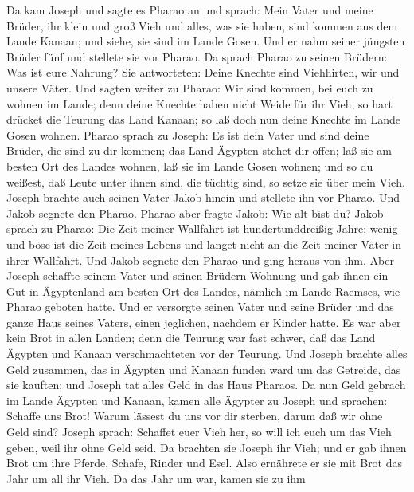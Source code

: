  Da kam Joseph und sagte es Pharao an und sprach: Mein Vater
und meine Brüder, ihr klein und groß Vieh und alles, was sie haben, sind
kommen aus dem Lande Kanaan; und siehe, sie sind im Lande Gosen.
 Und er nahm seiner jüngsten Brüder fünf und stellete sie
vor Pharao.  Da sprach Pharao zu seinen Brüdern: Was ist
eure Nahrung? Sie antworteten: Deine Knechte sind Viehhirten, wir und
unsere Väter.  Und sagten weiter zu Pharao: Wir sind kommen,
bei euch zu wohnen im Lande; denn deine Knechte haben nicht Weide für
ihr Vieh, so hart drücket die Teurung das Land Kanaan; so laß doch nun
deine Knechte im Lande Gosen wohnen.  Pharao sprach zu
Joseph: Es ist dein Vater und sind deine Brüder, die sind zu dir kommen;
 das Land Ägypten stehet dir offen; laß sie am besten Ort
des Landes wohnen, laß sie im Lande Gosen wohnen; und so du weißest, daß
Leute unter ihnen sind, die tüchtig sind, so setze sie über mein Vieh.
 Joseph brachte auch seinen Vater Jakob hinein und stellete
ihn vor Pharao. Und Jakob segnete den Pharao.  Pharao aber
fragte Jakob: Wie alt bist du?  Jakob sprach zu Pharao: Die
Zeit meiner Wallfahrt ist hundertunddreißig Jahre; wenig und böse ist
die Zeit meines Lebens und langet nicht an die Zeit meiner Väter in
ihrer Wallfahrt.  Und Jakob segnete den Pharao und ging
heraus von ihm.  Aber Joseph schaffte seinem Vater und
seinen Brüdern Wohnung und gab ihnen ein Gut in Ägyptenland am besten
Ort des Landes, nämlich im Lande Raemses, wie Pharao geboten hatte.
 Und er versorgte seinen Vater und seine Brüder und das
ganze Haus seines Vaters, einen jeglichen, nachdem er Kinder hatte.
 Es war aber kein Brot in allen Landen; denn die Teurung
war fast schwer, daß das Land Ägypten und Kanaan verschmachteten vor der
Teurung.  Und Joseph brachte alles Geld zusammen, das in
Ägypten und Kanaan funden ward um das Getreide, das sie kauften; und
Joseph tat alles Geld in das Haus Pharaos.  Da nun Geld
gebrach im Lande Ägypten und Kanaan, kamen alle Ägypter zu Joseph und
sprachen: Schaffe uns Brot! Warum lässest du uns vor dir sterben, darum
daß wir ohne Geld sind?  Joseph sprach: Schaffet euer Vieh
her, so will ich euch um das Vieh geben, weil ihr ohne Geld seid.
 Da brachten sie Joseph ihr Vieh; und er gab ihnen Brot um
ihre Pferde, Schafe, Rinder und Esel. Also ernährete er sie mit Brot das
Jahr um all ihr Vieh.  Da das Jahr um war, kamen sie zu ihm
